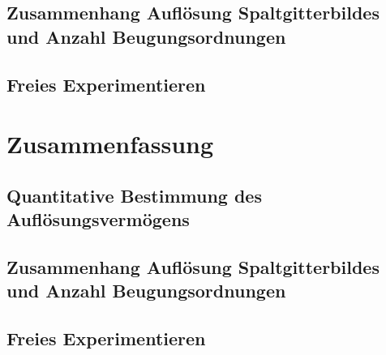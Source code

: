 \documentclass[12pt,a4paper,twoside]{article}
\begin{document}
\subsection{Zusammenhang Auflösung Spaltgitterbildes und Anzahl Beugungsordnungen}
\subsection{Freies Experimentieren}



\section{Zusammenfassung} %

\subsection{Quantitative Bestimmung des Auflösungsvermögens}
\subsection{Zusammenhang Auflösung Spaltgitterbildes und Anzahl Beugungsordnungen}
\subsection{Freies Experimentieren}




\printbibliography[heading=bibintoc]
\end{document}
